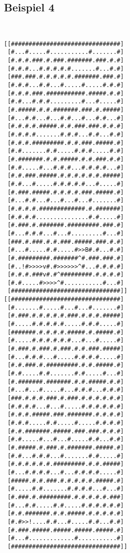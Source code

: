 \documentclass[a4paper,10pt,ngerman]{scrartcl}
\begin{document}
\subsection{Beispiel 4}\mbox{}\\
\begin{lstlisting}[frame=tb]
[[###############################]
 [#...#.....#...........#.......#]
 [#.#.#.###.#.###.#######.###.#.#]
 [#.#.#...#.#.#.#.#.......#...#.#]
 [###.###.#.#.#.#.#.#######.###.#]
 [#.#.#...#.#...#.....#.....#.#.#]
 [#.#.#.###.###########.#####.#.#]
 [#.#...#.#.#.........#...#.....#]
 [#.#####.#.#.#######.###.#.#####]
 [#...#.#...#...#.#...#...#.#...#]
 [#.#.#.#.#####.#.#.###.###.#.#.#]
 [#.#.#.#.......#.#.#...#.#...#.#]
 [#.#.#.#########.#.#.###.#####.#]
 [#.#.......#.#.....#.#.#.....#.#]
 [#.#######.#.#.#####.#.#.###.#.#]
 [#.#.....#...#.#.#...#.#.#.#...#]
 [#.#.###.#####.#.#.#.#.#.#.#####]
 [#.#...#.....#.#.#.#.#...#.....#]
 [#.###.#####.#.#.#.#.###.#####.#]
 [#...#.#...#...#...#...#.......#]
 [#.#.#.#.#############.#.#######]
 [#.#.#.#...............#.#.....#]
 [#.###.#.#######.#########.###.#]
 [#...#.#.#...#...#.........#...#]
 [###.#.###.#.#.###.#####.###.#.#]
 [#...#.....#.#.....#>>B#.#...#.#]
 [#.#########.#######^#.###.###.#]
 [#..!#>>>>v#.#>>>>>>^#...#.#.#.#]
 [#.#.#.###v#.#^#########.#.#.#.#]
 [#.#.....#>>>>^#...........#...#]
 [###############################]]
[[###############################]
 [#.......#.....#...#...#.......#]
 [#.###.#.#.#.#.#.###.#.#.#.#####]
 [#.....#.#.#.#.#.....#.#.#.....#]
 [#######.#.#.#.#.#####.#.#####.#]
 [#.....#.#.#.#.#.#...#...#.....#]
 [#.###.#.###.#.###.#.#.###.#####]
 [#...#.#.#...#.....#.#.#.#.....#]
 [#.#.###.#.#########.#.#.#####.#]
 [#.#.....#.#.......#.#.....#...#]
 [#.#######.#######.#.#.#####.#.#]
 [#...#...#.....#...#.#.#...#.#.#]
 [###.#.#.#.###.#.###.#.#.#.#.#.#]
 [#.#.#.#...#...#.....#.#.#.#.#.#]
 [#.#.#.#####.###.#######.#.#.#.#]
 [#.#.#.....#.#.....#.....#.#.#.#]
 [#.#.#######.#####.###.###.#.#.#]
 [#.#.....#...#...#.....#.#...#.#]
 [#.#####.#.###.#.#######.#####.#]
 [#.#...#.#.#...#.......#.#.....#]
 [#.#.#.#.#.#.#########.#.#.#####]
 [#...#.#.#.#...#...#.#.#.#.....#]
 [#####.#.#.###.#.#.#.#.#.#####.#]
 [#.....#.#.......#.#.#.#...#...#]
 [#.###.#.#########.#.#.#.#.#.###]
 [#...#.#.....#.#.....#.#.#.#.#.#]
 [#.#.#######.#.#.#####.#.#.#.#.#]
 [#.#>>!....#.#...#.....#.#...#.#]
 [#.###.#####.#####.#####.#####.#]
 [#...#.............#...........#]
 [###############################]]
\end{lstlisting}
\end{document}
